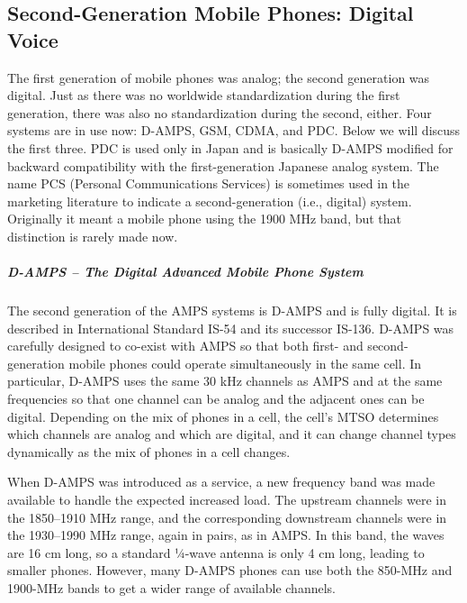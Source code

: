 \documentclass[b5paper,11pt]{memoir}
\begin{document}
\protect\hypertarget{0130661023_ch02lev1sec6.htmlux5cux23ch02lev2sec23}{}{}

\subsection{Second-Generation Mobile Phones: Digital Voice}

The first generation of mobile phones was analog; the second generation
was digital. Just as there was no worldwide standardization during the
first generation, there was also no standardization during the second,
either. Four systems are in use now: D-AMPS, GSM, CDMA, and PDC. Below
we will discuss the first three. PDC is used only in Japan and is
basically D-AMPS modified for backward compatibility with the
first-generation Japanese analog system. The name {PCS} ({Personal
Communications Services}) is sometimes used in the marketing literature
to indicate a second-generation (i.e., digital) system. Originally it
meant a mobile phone using the 1900 MHz band, but that distinction is
rarely made now.

\protect\hypertarget{0130661023_ch02lev1sec6.htmlux5cux23ch02lev3sec22}{}{}

\subparagraph{D-AMPS -- The Digital Advanced Mobile Phone System}

The second generation of the AMPS systems is {D-AMPS} and is fully
digital. It is described in International Standard IS-54 and its
successor IS-136. D-AMPS was carefully designed to co-exist with AMPS so
that both first- and second-generation mobile phones could operate
simultaneously in the same cell. In particular, D-AMPS uses the same 30
kHz channels as AMPS and at the same frequencies so that one channel can
be analog and the adjacent ones can be digital. Depending on the mix of
phones in a cell, the cell's MTSO determines which channels are analog
and which are digital, and it can change channel types dynamically as
the mix of phones in a cell changes.

When D-AMPS was introduced as a service, a new frequency band was made
available to handle the expected increased load. The upstream channels
were in the 1850--1910 MHz range, and the corresponding downstream
channels were in the 1930--1990 MHz range, again in pairs, as in AMPS.
In this band, the waves are 16 cm long, so a standard ¼-wave antenna is
only 4 cm long, leading to smaller phones. However, many D-AMPS phones
can use both the 850-MHz and 1900-MHz bands to get a wider range of
available channels.
\end{document}
